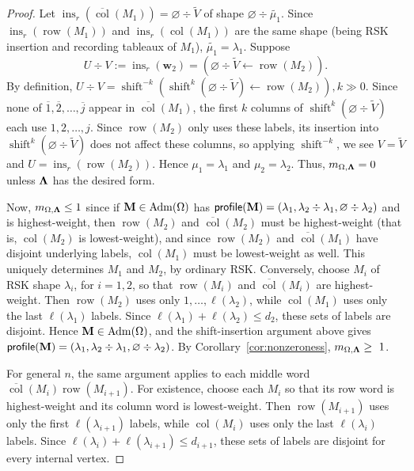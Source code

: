 \documentclass[12pt]{amsart}
\newcommand{\bs}{\boldsymbol}
\DeclareMathOperator{\Std}{\operatorname{Adm}}
\DeclareMathOperator{\ins}{\operatorname{ins}}
\theoremstyle{definition}
\theoremstyle{remark}
\newcommand{\barindex}[1]{\overline{#1}}
\begin{document}
\begin{proof}
Let $\ins_r(\overline{\operatorname{col}}(M_1))=\varnothing\div \widetilde{V}$ of shape $\varnothing\div \widetilde{\mu_1}$. Since 
$\ins_r(\operatorname{row}(M_1))$ and $\ins_r(\operatorname{col}(M_1))$ are the same shape
(being RSK insertion and recording tableaux of $M_1$), $\widetilde{\mu_1}=\lambda_1$. Suppose 
\[U\div V:=\ins_r({\bs w}_2)=(\varnothing \div \widetilde{V} \leftarrow \operatorname{row}(M_2)).\] 
By definition, 
$U\div V=\operatorname{shift}^{-k}(\operatorname{shift}^k(\varnothing\div \widetilde{V})\leftarrow \operatorname{row}(M_2)), k\gg 0$. 
Since none of $\barindex{1},\barindex{2},\ldots,\barindex{j}$ appear in $\overline{\operatorname{col}}(M_1)$, 
the first $k$ columns of $\operatorname{shift}^k(\varnothing\div \widetilde{V})$ each use $1,2,\ldots,j$. 
Since $\operatorname{row}(M_2)$ only uses these
labels, its insertion into $\operatorname{shift}^k(\varnothing\div \widetilde{V})$ does not affect these columns, so applying $\operatorname{shift}^{-k}$, we 
see $V=\widetilde{V}$ and $U=\ins_r(\operatorname{row}(M_2))$. Hence $\mu_1=\lambda_1$ and $\mu_2=\lambda_2$. 
Thus, $m_{\Omega,{\bf \Lambda}}=0$ unless ${\bf \Lambda}$ has the desired form. 

Now,
$m_{\Omega,{\bf \Lambda}}\leq 1$ since if ${\bf M}\in\Std(\Omega)$ has
${\sf profile}({\bf M})=(\lambda_1,\lambda_2\div\lambda_1,\varnothing\div\lambda_2)$ and is 
highest-weight, then $\operatorname{row}(M_2)$ and $\overline{\operatorname{col}}(M_2)$ must be highest-weight (that is, $\operatorname{col}(M_2)$ is lowest-weight), and since $\operatorname{row}(M_2)$ and $\overline{\operatorname{col}}(M_1)$ have disjoint underlying labels, $\operatorname{col}(M_1)$ must be lowest-weight as well. This uniquely determines $M_1$ and $M_2$, by ordinary RSK.  
Conversely, choose $M_i$ of RSK shape $\lambda_i$, for $i=1,2$,
so that $\operatorname{row}(M_i)$ and
$\overline{\operatorname{col}}(M_i)$ are highest-weight.
Then $\operatorname{row}(M_2)$ uses only
$1,\ldots,\ell(\lambda_2)$, while $\operatorname{col}(M_1)$ uses only
the last $\ell(\lambda_1)$ labels. Since
$\ell(\lambda_1)+\ell(\lambda_2)\leq d_2$,
these sets of labels are disjoint. Hence
${\bf M}\in\Std(\Omega)$, and the shift-insertion argument above gives
${\sf profile}({\bf M})
=(\lambda_1,\lambda_2\div\lambda_1,\varnothing\div\lambda_2)$.
By Corollary~\ref{cor:nonzeroness}, $m_{\Omega,{\bf\Lambda}}\geq~1$.

For general $n$, the same argument applies to each middle word
$\overline{\operatorname{col}}(M_i)\operatorname{row}(M_{i+1})$.
For existence, choose each $M_i$ so that its row word is highest-weight
and its column word is lowest-weight. Then
$\operatorname{row}(M_{i+1})$ uses only the first
$\ell(\lambda_{i+1})$ labels, while $\operatorname{col}(M_i)$ uses only
the last $\ell(\lambda_i)$ labels. Since
$\ell(\lambda_i)+\ell(\lambda_{i+1})\le d_{i+1}$,
these sets of labels are disjoint for every internal vertex.
\end{proof}
\end{document}
